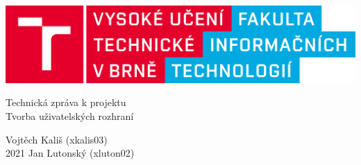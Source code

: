 \documentclass[a4paper, 11pt, twocolumn]{article}
\begin{document}
	\begin{titlepage}
		\begin{center}
			\begin{center}
			\includegraphics[scale=0.15]{logo_cz.png} \\
			\end{center}
			\huge {Technická zpráva k projektu} \\
			\Large {Tvorba uživatelských rozhraní} \\
		\end{center}

		\Large{\hfill Vojtěch Kališ (xkalis03)} \\
		\Large{2021 \hfill Jan Lutonský (xluton02)}
	\end{titlepage}
	



\end{document}
